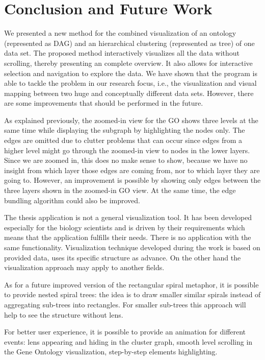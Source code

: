 \newpage
\section{Conclusion and Future Work}
\label{sec:conclusion}

We presented a new method for the combined visualization of an ontology (represented as DAG) and an hierarchical clustering (represented as tree) of one data set. The proposed method interactively visualizes all the data without scrolling, thereby presenting an complete overview. It also allows for interactive selection and navigation to explore the data. We have shown that the program is able to tackle the problem in our research focus, i.e., the visualization and visual mapping between two huge and conceptually different data sets. However, there are some improvements that should be performed in the future.

As explained previously, the zoomed-in view for the GO shows three levels at the same time while displaying the subgraph by highlighting the nodes only. The edges are omitted due to clutter problems that can occur since edges from a higher level might go through the zoomed-in view to nodes in the lower layers. Since we are zoomed in, this does no make sense to show, because we have no insight from which layer those edges are coming from, nor to which layer they are going to. However, an improvement is possible by showing only edges between the three layers shown in the zoomed-in GO view. At the same time, the edge bundling algorithm could also be improved.

The thesis application is not a general visualization tool. It has been developed especially for the biology scientists and is driven by their requirements which means that the application fulfills their needs. There is no application with the same functionality. Visualization technique developed during the work is based on provided data, uses its specific structure as advance. On the other hand the visualization approach may apply to another fields.

As for a future improved version of the rectangular spiral metaphor, it is possible to provide nested spiral trees: the idea is to draw smaller similar spirals instead of aggregating sub-trees into rectangles. For smaller sub-trees this approach will help to see the structure without lens.

For better user experience, it is possible to provide an animation for different events: lens appearing and hiding in the cluster graph, smooth level scrolling in the Gene Ontology visualization, step-by-step elements highlighting.
